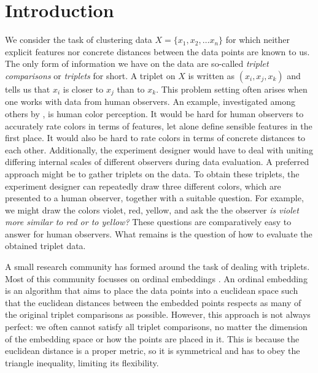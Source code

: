 \chapter{Introduction}\label{Introduction}
We consider the task of clustering data $X = \{x_1, x_2, \ldots x_n \}$ for which neither 
explicit features nor concrete distances between the data points are known to us. 
The only form of information we have on the data are so-called 
\textit{triplet comparisons} or \textit{triplets} for short. A triplet 
on $X$ is written as $(x_i, x_j, x_k)$ and tells us that $x_i$ is closer to $x_j$ than to $x_k$. 
This problem setting often arises when one works with data from human observers. 
An example, investigated among others by \citep{shepardAnalysisProximitiesMultidimensional1962}, 
is human color perception. It would be hard for human observers to accurately rate colors in 
terms of features, let alone define sensible features in the first place.  It would also be hard to rate colors in terms of concrete distances to each other.
Additionally, the experiment designer would have to deal with uniting differing internal scales of different observers during data evaluation. 
A preferred approach might be to gather triplets on the data. 
To obtain these triplets, the experiment designer can repeatedly draw
three different colors, which are presented to a human observer, together with a 
suitable question. For example, we might draw the colors violet, red, yellow,
and ask the the observer \textit{is violet more similar to red or to yellow?} These questions
are comparatively easy to answer for human observers. 
What remains is the question of how to evaluate the obtained triplet data.

A small research community has formed around the task of dealing with triplets.
Most of this community focusses on ordinal embeddings
\citep{agarwalGeneralizedNonmetricMultidimensional2007, tamuzAdaptivelyLearningCrowd2011,
laurensvandermaatenStochasticTripletEmbedding2012,   teradaLocalOrdinalEmbedding2014, jainFiniteSamplePrediction2016, ghoshLandmarkOrdinalEmbedding2019, andertonScalingOrdinalEmbedding2019}.
An ordinal embedding is an algorithm that aims to place the data points into a euclidean space
such that the euclidean distances between the embedded points respects as many of the original triplet comparisons as possible. 
However, this approach is not always perfect: we often cannot satisfy all triplet 
comparisons, no matter the dimension of the embedding space or how the points are placed in it.
This is because the euclidean distance is a proper metric, so it is symmetrical and has to obey the triangle inequality, limiting its flexibility. 

